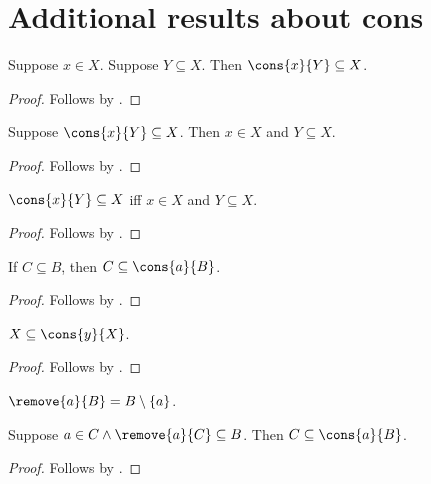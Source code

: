 

\section{Additional results about cons}

\begin{proposition}\label{cons_subseteq_intro}
    Suppose $x\in X$.
    Suppose $Y\subseteq X$.
    Then $\cons{x}{Y}\subseteq X$.
\end{proposition}
\begin{proof}
    Follows by .
\end{proof}

\begin{proposition}\label{cons_subseteq_elim}
    Suppose $\cons{x}{Y}\subseteq X$.
    Then $x\in X$ and $Y\subseteq X$.
\end{proposition}
\begin{proof}
    Follows by .
\end{proof}

\begin{proposition}\label{cons_subseteq_iff}
    $\cons{x}{Y}\subseteq X$ iff $x\in X$ and $Y\subseteq X$.
\end{proposition}
\begin{proof}
    Follows by .
\end{proof}

\begin{proposition}\label{subseteq_cons_right}
    If $C\subseteq B$, then $C\subseteq \cons{a}{B}$.
\end{proposition}
\begin{proof}
    Follows by .
\end{proof}

\begin{corollary}\label{subseteq_cons_self}
    $X\subseteq \cons{y}{X}$.
\end{corollary}
\begin{proof}
    Follows by .
\end{proof}

\begin{abbreviation}\label{remove_point}
    $\remove{a}{B} = B\setminus\{a\}$.
\end{abbreviation}

\begin{proposition}\label{subseteq_cons_intro_left}
    Suppose $a\in C \land \remove{a}{C} \subseteq B$.
    Then $C\subseteq \cons{a}{B}$.
\end{proposition}
\begin{proof}
    Follows by .
\end{proof}

